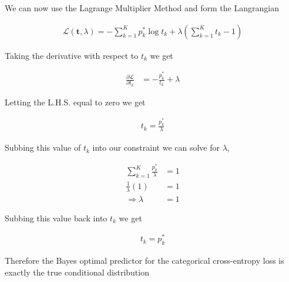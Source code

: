 \documentclass[11pt]{article}
\begin{document}
    We can now use the Lagrange Multiplier Method and form the Langrangian 

    \begin{align*}
        \mathcal{L}(\mathbf{t}, \lambda) = -\sum_{k = 1}^K p^*_k \log t_k + \lambda
        \left(\sum_{k = 1}^K t_k - 1\right)
    \end{align*}

    Taking the derivative with respect to $t_k$ we get 

    \begin{align*}
        \frac{\partial\mathcal{L}}{\partial t_k} 
        &= -\frac{p^*_k}{t_k} + \lambda
    \end{align*}

    Letting the L.H.S. equal to zero we get  

    \begin{align*}
        t_k = \frac{p^*_k}{\lambda}
    \end{align*}

    Subbing this value of $t_k$ into our constraint we can solve for $\lambda$,

    \begin{align*}
        \sum_{k = 1}^K \frac{p^*_k}{\lambda} &= 1 \\ 
        \frac{1}{\lambda}(1) &= 1 \\ 
        \Rightarrow \lambda &= 1
    \end{align*}

    Subbing this value back into $t_k$ we get 

    \begin{align*}
        t_k = p^*_k
    \end{align*}

    Therefore the Bayes optimal predictor for the categorical cross-entropy loss is exactly the true
    conditional distribution
\end{document}
